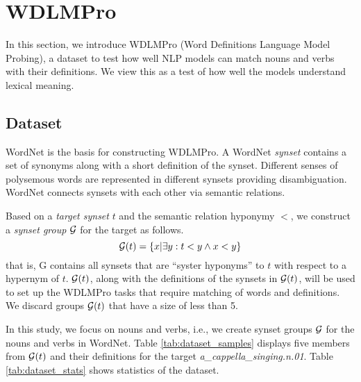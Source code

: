 \documentclass[11pt,a4paper]{article}
\begin{document}
\section{WDLMPro}
In this section,
we introduce  WDLMPro (Word Definitions Language Model
Probing), a dataset to test how well NLP models can match
nouns and verbs with  their
definitions.
We view this as a test of how well the models understand lexical meaning.

\subsection{Dataset}
WordNet \cite{miller95wordnet} is the basis for
constructing WDLMPro.  A WordNet \textit{synset} contains a
set of synonyms along with a short definition of
the synset.  Different senses of polysemous words are
represented in different synsets providing
disambiguation. WordNet connects synsets with each other via
semantic relations.

Based on a \emph{target synset}
$t$ and the semantic relation hyponymy $<$, we construct
a \emph{synset group} $\cal G$ for the target as follows.
\[
  {\cal G}(t) = \{ x | \exists y: t<y \wedge x<y \}
  \]
that is, {\cal G} contains all synsets that are ``syster
hyponyms'' to $t$ with respect to a hypernym of $t$.
${\cal G}(t)$, along with the definitions of the synsets in
${\cal G}(t)$,
will be used to
set up the WDLMPro tasks that require matching of words and definitions.
We discard groups ${\cal G}(t)$ that
have a size of less than 5.


In this study, we focus on nouns and verbs, i.e., we create
synset groups ${\cal G}$ for the nouns and verbs in WordNet.
Table
\ref{tab:dataset_samples} displays five members from ${\cal
  G} (t)$ 
and their definitions
for the target
\emph{a\_cappella\_singing.n.01}. 
Table \ref{tab:dataset_stats} shows statistics of the dataset.


  
\end{document}
